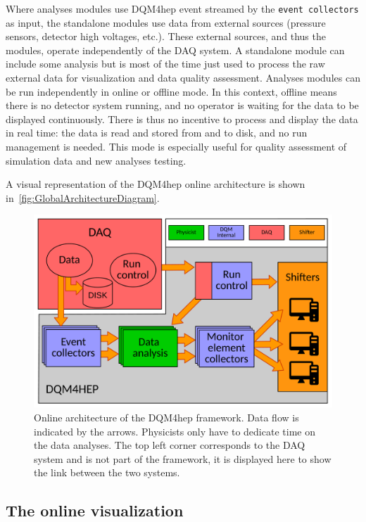 \documentclass{webofc}
\begin{document}
Where analyses modules use DQM4hep event streamed by the \texttt{event collectors} as input, the standalone modules use data from external sources (pressure sensors, detector high voltages, etc.).
These external sources, and thus the modules, operate independently of the DAQ system.
A standalone module can include some analysis but is most of the time just used to process the raw external data for visualization and data quality assessment.
Analyses modules can be run independently in online or offline mode.
In this context, offline means there is no detector system running, and no operator is waiting for the data to be displayed continuously.
There is thus no incentive to process and display the data in real time: the data is read and stored from and to disk, and no run management is needed.
This mode is especially useful for quality assessment of simulation data and new analyses testing.


A visual representation of the DQM4hep online architecture is shown in~\autoref{fig:GlobalArchitectureDiagram}.

\begin{figure}
  \centering
  \includegraphics[width=\textwidth]{figs/AnalysisModuleArchitecture.pdf}
  \caption{Online architecture of the DQM4hep framework. Data flow is indicated by the arrows. Physicists only have to dedicate time on the data analyses. The top left corner corresponds to the DAQ system and is not part of the framework, it is displayed here to show the link between the two systems.}
  \label{fig:GlobalArchitectureDiagram}
\end{figure}


\subsection{The online visualization}
\label{subsec:vis}
\end{document}
